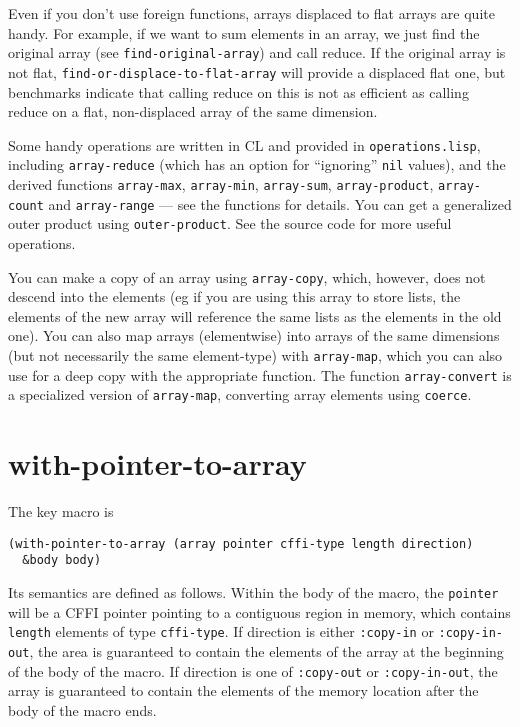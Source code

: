 \documentclass[12pt,a4paper,dvipdfm]{article}
\begin{document}
Even if you don't use foreign functions, arrays displaced to flat
arrays are quite handy.  For example, if we want to sum elements in an
array, we just find the original array (see
\lstinline!find-original-array!) and call reduce.  If the original
array is not flat, \lstinline!find-or-displace-to-flat-array! will
provide a displaced flat one, but benchmarks indicate that calling
reduce on this is not as efficient as calling reduce on a flat,
non-displaced array of the same dimension.

Some handy operations are written in CL and provided in
\verb!operations.lisp!, including \lstinline!array-reduce! (which has
an option for ``ignoring'' \lstinline!nil! values), and the derived
functions \lstinline!array-max!, \lstinline!array-min!,
\lstinline!array-sum!, \lstinline!array-product!,
\lstinline!array-count! and \lstinline!array-range! --- see the
functions for details.  You can get a generalized outer product using
\lstinline!outer-product!.  See the source code for more useful
operations.

You can make a copy of an array using \lstinline!array-copy!, which,
however, does not descend into the elements (eg if you are using this
array to store lists, the elements of the new array will reference the
same lists as the elements in the old one).  You can also map arrays
(elementwise) into arrays of the same dimensions (but not necessarily
the same element-type) with \lstinline!array-map!, which you can also
use for a deep copy with the appropriate function.  The function
\lstinline!array-convert! is a specialized version of
\lstinline!array-map!, converting array elements using
\lstinline!coerce!.


\section{with-pointer-to-array}
\label{sec:with-pointer-array}

The key macro is 
\begin{lstlisting}
(with-pointer-to-array (array pointer cffi-type length direction)
  &body body)
\end{lstlisting}

Its semantics are defined as follows.  Within the body of the macro,
the \lstinline!pointer! will be a CFFI pointer pointing to a
contiguous region in memory, which contains \lstinline!length!
elements of type \lstinline!cffi-type!.  If direction is either
\lstinline!:copy-in! or \lstinline!:copy-in-out!, the area is
guaranteed to contain the elements of the array at the beginning of
the body of the macro.  If direction is one of \lstinline!:copy-out!
or \lstinline!:copy-in-out!, the array is guaranteed to contain the
elements of the memory location after the body of the macro ends.
\end{document}
